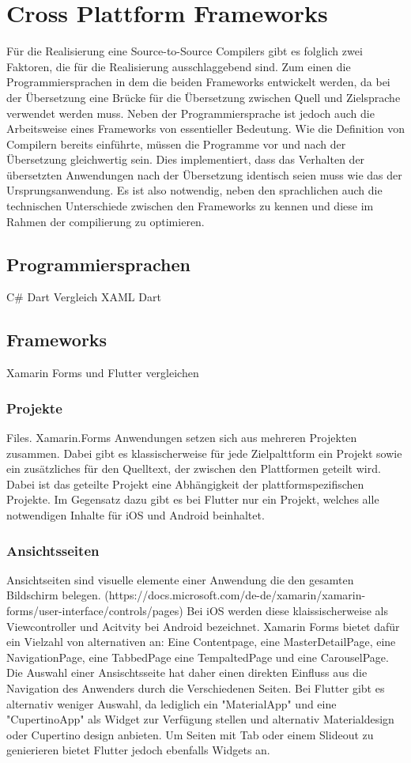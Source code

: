 \chapter{Cross Plattform Frameworks}
Für die Realisierung eine Source-to-Source Compilers gibt es folglich zwei Faktoren,  die für die Realisierung ausschlaggebend sind.  Zum einen die Programmiersprachen in dem die beiden Frameworks entwickelt werden,  da bei der Übersetzung eine Brücke für die Übersetzung zwischen Quell und Zielsprache verwendet werden muss.  Neben der Programmiersprache ist jedoch auch die Arbeitsweise eines Frameworks von essentieller Bedeutung.  Wie die Definition von Compilern bereits einführte,  müssen die Programme vor und nach der Übersetzung gleichwertig sein.  Dies implementiert,  dass das Verhalten der übersetzten Anwendungen nach der Übersetzung identisch seien muss wie das der Ursprungsanwendung.  Es ist also notwendig,  neben den sprachlichen auch die technischen Unterschiede zwischen den Frameworks zu kennen und diese im Rahmen der compilierung zu optimieren. 
\section{Programmiersprachen}
C\# Dart Vergleich
XAML Dart
\section{Frameworks}
Xamarin Forms und Flutter vergleichen
\subsection{Projekte}
Files.
Xamarin.Forms Anwendungen setzen sich aus mehreren Projekten zusammen.  Dabei gibt es klassischerweise für jede Zielpalttform ein Projekt sowie ein zusätzliches für den Quelltext, der zwischen den Plattformen geteilt wird.  Dabei ist das geteilte Projekt eine Abhängigkeit der plattformspezifischen Projekte.  Im Gegensatz dazu gibt es bei Flutter nur ein Projekt, welches alle notwendigen Inhalte für iOS und Android beinhaltet. 
\subsection{Ansichtsseiten}
Ansichtseiten sind visuelle elemente einer Anwendung die den gesamten Bildschirm belegen. (https://docs.microsoft.com/de-de/xamarin/xamarin-forms/user-interface/controls/pages) Bei iOS werden diese klaissischerweise als Viewcontroller und Acitvity bei Android bezeichnet.   Xamarin Forms bietet dafür ein Vielzahl von alternativen an: Eine Contentpage, eine MasterDetailPage, eine NavigationPage,  eine TabbedPage eine TempaltedPage und eine CarouselPage.
Die Auswahl einer Ansischtsseite hat daher einen direkten Einfluss aus die Navigation des Anwenders durch die Verschiedenen Seiten.
Bei Flutter gibt es alternativ weniger Auswahl, da lediglich ein "MaterialApp" und eine "CupertinoApp" als Widget zur Verfügung stellen und alternativ Materialdesign oder Cupertino design anbieten. 
Um Seiten mit Tab oder einem Slideout zu genierieren bietet Flutter jedoch ebenfalls Widgets an. 
